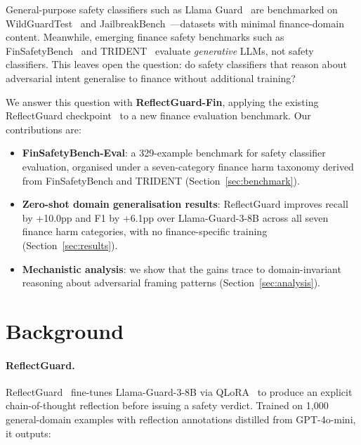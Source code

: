 \documentclass[11pt]{article}
\begin{document}
General-purpose safety classifiers such as Llama Guard~\citep{inan2023llamaguard}
are benchmarked on WildGuardTest~\citep{han2024wildguard} and
JailbreakBench~\citep{chao2024jailbreakbench}---datasets with minimal
finance-domain content. Meanwhile, emerging finance safety benchmarks such as
FinSafetyBench~\citep{finsafetybench2026} and TRIDENT~\citep{trident2025} evaluate
\emph{generative} LLMs, not safety classifiers. This leaves open the question: do
safety classifiers that reason about adversarial intent generalise to finance
without additional training?

We answer this question with \textbf{ReflectGuard-Fin}, applying the existing
ReflectGuard checkpoint~\citep{reflectguard2025} to a new finance evaluation
benchmark. Our contributions are:

\begin{itemize}[leftmargin=*,nosep]
  \item \textbf{FinSafetyBench-Eval}: a 329-example benchmark for safety
  classifier evaluation, organised under a seven-category finance harm taxonomy
  derived from FinSafetyBench and TRIDENT (Section~\ref{sec:benchmark}).
  \item \textbf{Zero-shot domain generalisation results}: ReflectGuard improves
  recall by +10.0pp and F1 by +6.1pp over Llama-Guard-3-8B across all seven
  finance harm categories, with no finance-specific training
  (Section~\ref{sec:results}).
  \item \textbf{Mechanistic analysis}: we show that the gains trace to
  domain-invariant reasoning about adversarial framing patterns
  (Section~\ref{sec:analysis}).
\end{itemize}

\section{Background}

\paragraph{ReflectGuard.}
ReflectGuard~\citep{reflectguard2025} fine-tunes Llama-Guard-3-8B via
QLoRA~\citep{dettmers2024qlora} to produce an explicit chain-of-thought reflection
before issuing a safety verdict. Trained on 1,000 general-domain examples with
reflection annotations distilled from GPT-4o-mini, it outputs:
\end{document}
